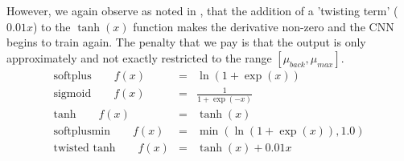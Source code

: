 \documentclass[12pt]{article}
\newcommand{\ber}{\begin{eqnarray}}
\newcommand{\eer}{\end{eqnarray}}
\begin{document}
However, we again observe as noted in \cite{bookchap:lecun98b}, that the addition of a 'twisting term' ($0.01x$) to the $\tanh(x)$ function makes the derivative non-zero and the CNN begins to train again. The penalty that we pay is that the output is only approximately and not exactly restricted to the range $[\mu_{back},\mu_{max}]$. 
\begin{subequations}
\ber
\text{softplus}\qquad f(x) &=& \ln(1+\exp(x)) \label{eqn:softplus}\\
\text{sigmoid}\qquad f(x) &=& \frac{1}{1+\exp(-x)}\label{eqn:sigmoid}\\
\text{tanh} \qquad f(x) &=& \tanh(x) \label{eqn:tanh}\\
\text{softplusmin} \qquad f(x) &=& \min(\ln(1+\exp(x)),1.0)\label{eqn:softplusmin} \\
\text{twisted tanh} \qquad f(x) &=& \tanh(x) + 0.01x  \label{eqn:twisttanh}
\eer
\end{subequations}
%
\end{document}
